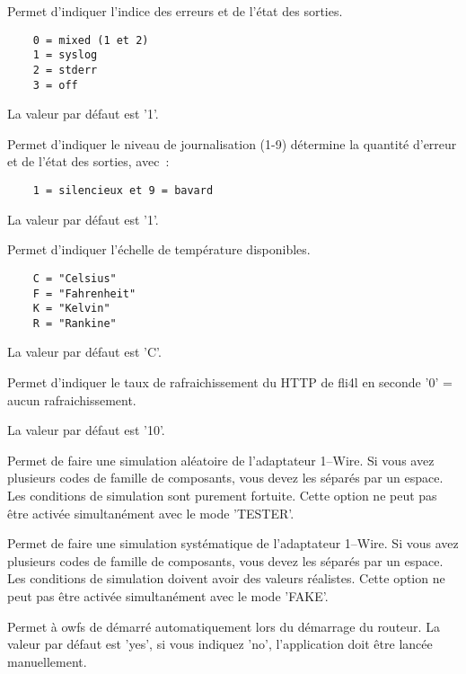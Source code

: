 \begin{description}
 Permet d'indiquer l'indice des erreurs et de l'état des sorties.

\begin{verbatim}
    0 = mixed (1 et 2)
    1 = syslog
    2 = stderr
    3 = off
\end{verbatim}

La valeur par défaut est '1'.

 Permet d'indiquer le niveau de journalisation (1-9) détermine la quantité d'erreur et
 de l'état des sorties, avec~:

\begin{verbatim}
    1 = silencieux et 9 = bavard
\end{verbatim}

La valeur par défaut est '1'.

 Permet d'indiquer l'échelle de température disponibles.
\begin{verbatim}
    C = "Celsius"
    F = "Fahrenheit"
    K = "Kelvin"
    R = "Rankine"
\end{verbatim}

La valeur par défaut est 'C'.

 Permet d'indiquer le taux de rafraichissement du HTTP de fli4l en seconde '0' = aucun
 rafraichissement.

La valeur par défaut est '10'.

 Permet de faire une simulation aléatoire de l'adaptateur 1--Wire. Si vous avez
 plusieurs codes de famille de composants, vous devez les séparés par un espace.
 Les conditions de simulation sont purement fortuite. Cette option ne peut pas
 être activée simultanément avec le mode 'TESTER'.

 Permet de faire une simulation systématique de l'adaptateur 1--Wire. Si vous avez
 plusieurs codes de famille de composants, vous devez les séparés par un espace.
 Les conditions de simulation doivent avoir des valeurs réalistes. Cette option
 ne peut pas être activée simultanément avec le mode 'FAKE'.

 Permet à owfs de démarré automatiquement lors du démarrage du routeur. La valeur
 par défaut est 'yes', si vous indiquez 'no', l'application doit être lancée
 manuellement.


\end{description}
